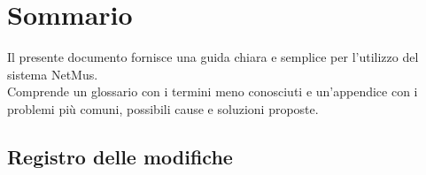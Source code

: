 
\newcommand{\nomedoc}{Manuale Utente}
\newcommand{\versione}{2.0}
\newcommand{\versioneglossario}{4.0}
\newcommand{\versionenormeprogetto}{4.0}
\newcommand{\nomefile}{ManualeUtente-\versione.pdf}
\newcommand{\datacreazione}{24 Febbraio 2011}
\newcommand{\datamodifica}{19 Marzo 2011}
\newcommand{\stato}{formale}
\newcommand{\uso}{esterno}
\newcommand{\redazione}{Baron Federico}
\newcommand{\verifica}{Cosimo Caputo}
\newcommand{\approvazione}{Mandolo Andrea}
\newcommand{\distribuzione}{
VT.G \\
& Prof. Vardanega Tullio\\
& Prof. Cardin Riccardo }







\chapter*{Sommario}
\thispagestyle{fancy}
Il presente documento fornisce una guida chiara e semplice per l'utilizzo del
sistema NetMus.\\
Comprende un glossario con i termini meno conosciuti e un'appendice con i
problemi pi\`u comuni, possibili cause e soluzioni proposte.

\newpage
\section*{Registro delle modifiche}

